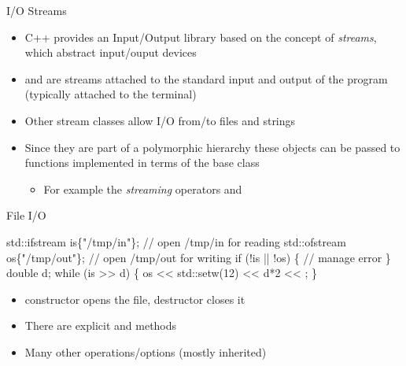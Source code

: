 \begin{frame}{I/O Streams}

  \begin{itemize}
  \item C++ provides an Input/Output library based on the concept of \textit{streams}, which abstract input/ouput devices
  \item {} and  are streams attached to the
    standard input and output of the program (typically attached to the
    terminal)
  \item Other stream classes allow I/O from/to files and strings
  \item Since they are part of a polymorphic hierarchy these objects can be
    passed to functions implemented in terms of the base class
    \begin{itemize}
    \item For example the \textit{streaming} operators \code{<<} and \code{>>}
    \end{itemize}
  \end{itemize}
\end{frame}

\begin{frame}[fragile]{File I/O}

  \begin{codeblock}
std::ifstream is\{"/tmp/in"\};  // open /tmp/in for reading
std::ofstream os\{"/tmp/out"\}; // open /tmp/out for writing
if (!is || !os) \{
  // manage error
\}
double d;
while (is \alert{>>} d) \{
  os \alert{<<} std::setw(12) \alert{<<} d*2 \alert{<<} \bslashn{};
\}\end{codeblock}

  \begin{itemize}
  \item {} constructor opens the file, destructor closes it
  \item There are explicit  and  methods
  \item Many other operations/options (mostly inherited)
  \end{itemize}

\end{frame}

